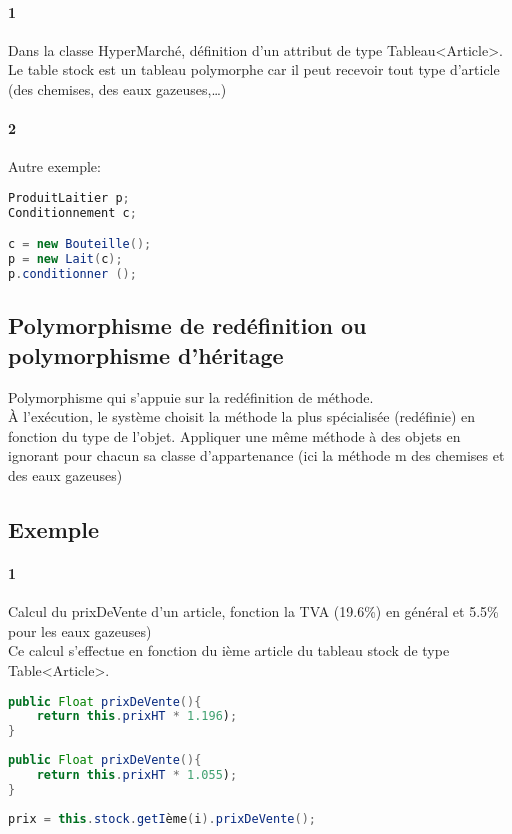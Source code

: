 	\paragraph{1} Dans la classe HyperMarché, définition d'un attribut de type Tableau<Article>. Le table stock est un tableau
	polymorphe car il peut recevoir tout type d'article (des chemises, des eaux gazeuses,\ldots)
	\paragraph{2} Autre exemple: \\
	\begin{lstlisting}[language=java]
ProduitLaitier p;
Conditionnement c;

c = new Bouteille();
p = new Lait(c);
p.conditionner ();
	\end{lstlisting}

	\subsection{Polymorphisme de redéfinition ou polymorphisme d'héritage}
	Polymorphisme qui s'appuie sur la redéfinition de méthode. \\
	À l'exécution, le système choisit la méthode la plus spécialisée (redéfinie) en fonction du type 
	de l'objet.
	Appliquer une même méthode à des objets en ignorant pour chacun sa classe d'appartenance (ici la méthode m des chemises et des eaux gazeuses)
	\\

	\subsection{Exemple}
	\paragraph{1}
	Calcul du prixDeVente d'un article, fonction  la TVA (19.6\%) en général et 5.5\% pour les eaux gazeuses)\\
	Ce calcul s'effectue en fonction du ième article du tableau stock de type Table<Article>.
	\begin{lstlisting}[language=java, caption=Dans Article]
public Float prixDeVente(){
	return this.prixHT * 1.196);
}
	\end{lstlisting}

	\begin{lstlisting}[language=java, caption=Dans eau gazeuse]
public Float prixDeVente(){
	return this.prixHT * 1.055);
}
	\end{lstlisting}
	\begin{lstlisting}[language=java, caption=Dans supermarché]
prix = this.stock.getIème(i).prixDeVente();
\end{lstlisting}

